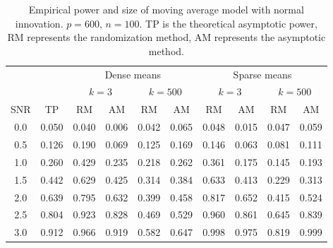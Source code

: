 \documentclass[review]{elsarticle}
\theoremstyle{plain}
\theoremstyle{definition}
\theoremstyle{remark}
\begin{document}
\begin{table}[ht]
    \caption{Empirical power and size of moving average model with normal innovation.  $p=600$, $n=100$. TP is the theoretical asymptotic power, RM represents the randomization method, AM represents the asymptotic method.}
    \centering
    \begin{tabular}{cccccccccc}
          \toprule
          & & \multicolumn{4}{c}{Dense means} &\multicolumn{4}{c}{Sparse means}\\
          \cmidrule(r){3-6}\cmidrule(r){7-10}
          & & \multicolumn{2}{c}{$k=3$} & \multicolumn{2}{c}{$k=500$} & \multicolumn{2}{c}{$k=3$}& \multicolumn{2}{c}{$k=500$}\\
          \cmidrule(r){3-4}  \cmidrule(r){5-6} \cmidrule(r){7-8}  \cmidrule(r){9-10}
           SNR& TP & RM & AM & RM & AM & RM & AM & RM & AM  \\ 
            \midrule
        0.0 & 0.050 & 0.040 & 0.006 & 0.042 & 0.065 & 0.048 & 0.015 & 0.047 & 0.059 \\ 
        0.5 & 0.126 & 0.190 & 0.069 & 0.125 & 0.169 & 0.146 & 0.063 & 0.081 & 0.111 \\ 
        1.0 & 0.260 & 0.429 & 0.235 & 0.218 & 0.262 & 0.361 & 0.175 & 0.145 & 0.193 \\ 
        1.5 & 0.442 & 0.629 & 0.425 & 0.314 & 0.384 & 0.633 & 0.413 & 0.229 & 0.313 \\ 
        2.0 & 0.639 & 0.795 & 0.632 & 0.399 & 0.458 & 0.817 & 0.652 & 0.415 & 0.524 \\ 
        2.5 & 0.804 & 0.923 & 0.828 & 0.469 & 0.529 & 0.960 & 0.861 & 0.645 & 0.839 \\ 
        3.0 & 0.912 & 0.966 & 0.919 & 0.582 & 0.647 & 0.998 & 0.975 & 0.819 & 0.999 \\ 
        \bottomrule
    \end{tabular}
\end{table}
\end{document}
